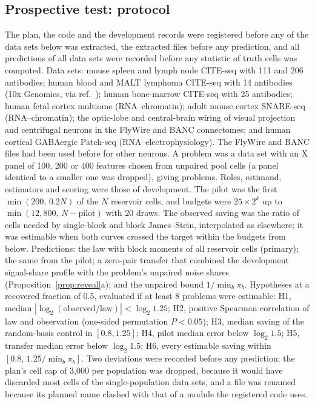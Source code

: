\subsection*{Prospective test: protocol}
The plan, the code and the development records were registered before any of the \PredNData{} data sets below was extracted, the extracted files before any prediction, and all predictions of all data sets were recorded before any statistic of truth cells was computed. Data sets: mouse spleen and lymph node CITE-seq with 111 and 206 antibodies\cite{totalvi2021}; human blood and MALT lymphoma CITE-seq with 14 antibodies (10x Genomics, via ref.~); human bone-marrow CITE-seq with 25 antibodies\cite{stuart2019}; human fetal cortex multiome (RNA--chromatin)\cite{trevino2021}; adult mouse cortex SNARE-seq (RNA--chromatin)\cite{chen2019snare}; the optic-lobe and central-brain wiring of visual projection and centrifugal neurons in the FlyWire\cite{dorkenwald2024,schlegel2024} and BANC\cite{bates2026} connectomes; and human cortical GABAergic Patch-seq (RNA--electrophysiology)\cite{lee2023gaba}. The FlyWire and BANC files had been used before for other neurons. A problem was a data set with an X panel of 100, 200 or 400 features chosen from unpaired pool cells (a panel identical to a smaller one was dropped), giving \PredNProblems{} problems. Roles, estimand, estimators and scoring were those of development. The pilot was the first $\min(200,\,0.2N)$ of the $N$ reservoir cells, and budgets were $25\times2^k$ up to $\min(12{,}800,\,N-\text{pilot})$ with 20 draws. The observed saving was the ratio of cells needed by single-block and block James--Stein, interpolated as elsewhere; it was estimable when both curves crossed the target within the budgets from below. Predictions: the law with block moments of all reservoir cells (primary); the same from the pilot; a zero-pair transfer that combined the development signal-share profile with the problem's unpaired noise shares (Proposition~\ref{prop:reveal}a); and the unpaired bound $1/\min_b\pi_b$. Hypotheses at a recovered fraction of 0.5, evaluated if at least 8 problems were estimable: H1, median $|\log_2(\text{observed}/\text{law})|<\log_2 1.25$; H2, positive Spearman correlation of law and observation (one-sided permutation $P<0.05$); H3, median saving of the random-basis control in $[0.8,1.25]$; H4, pilot median error below $\log_2 1.5$; H5, transfer median error below $\log_2 1.5$; H6, every estimable saving within $[0.8,\,1.25/\min_b\pi_b]$. Two deviations were recorded before any prediction: the plan's cell cap of 3,000 per population was dropped, because it would have discarded most cells of the single-population data sets, and a file was renamed because its planned name clashed with that of a module the registered code uses.

